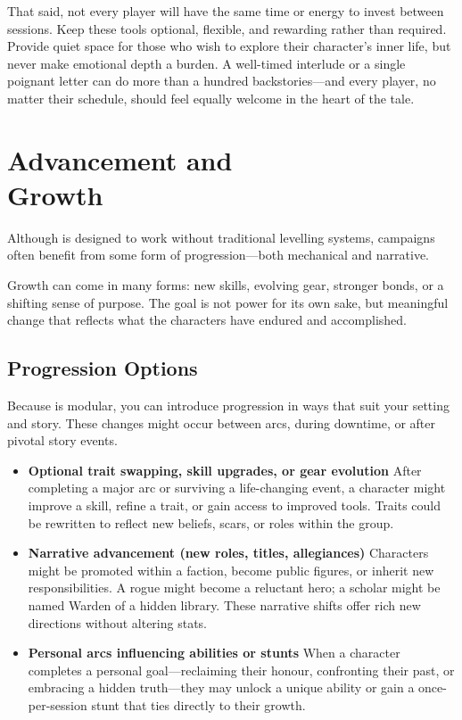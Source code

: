 That said, not every player will have the same time or energy to invest between sessions. Keep these tools optional, flexible, and rewarding rather than required. Provide quiet space for those who wish to explore their character’s inner life, but never make emotional depth a burden. A well-timed interlude or a single poignant letter can do more than a hundred backstories—and every player, no matter their schedule, should feel equally welcome in the heart of the tale.



\section[Advancement and Growth]{Advancement and\\ Growth}

Although \wyrd is designed to work without traditional levelling systems, campaigns often benefit from some form of progression—both mechanical and narrative. 

Growth can come in many forms: new skills, evolving gear, stronger bonds, or a shifting sense of purpose. The goal is not power for its own sake, but meaningful change that reflects what the characters have endured and accomplished.

\subsection*{Progression Options}

Because \wyrd is modular, you can introduce progression in ways that suit your setting and story. These changes might occur between arcs, during downtime, or after pivotal story events.

\begin{itemize}\raggedright
    \item \textbf{Optional trait swapping, skill upgrades, or gear evolution}  
    After completing a major arc or surviving a life-changing event, a character might improve a skill, refine a trait, or gain access to improved tools. Traits could be rewritten to reflect new beliefs, scars, or roles within the group.

    \item \textbf{Narrative advancement (new roles, titles, allegiances)}  
    Characters might be promoted within a faction, become public figures, or inherit new responsibilities. A rogue might become a reluctant hero; a scholar might be named Warden of a hidden library. These narrative shifts offer rich new directions without altering stats.

    \item \textbf{Personal arcs influencing abilities or stunts}  
    When a character completes a personal goal—reclaiming their honour, confronting their past, or embracing a hidden truth—they may unlock a unique ability or gain a once-per-session stunt that ties directly to their growth.
\end{itemize}

